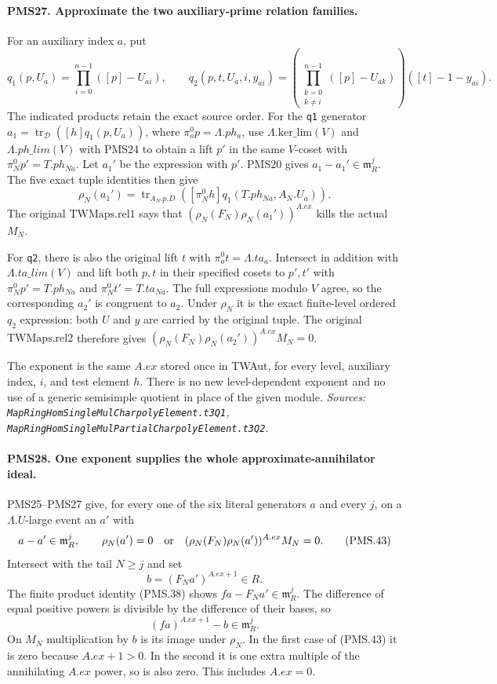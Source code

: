 \paragraph{PMS27. Approximate the two auxiliary-prime relation families.}
\label{claim:PMS27}
For an auxiliary index $a$, put
\[
 q_1(p,U_a)=\prod_{i=0}^{n-1}([p]-U_{ai}),\qquad
 q_2(p,t,U_a,i,y_{ai})
   =\left(\prod_{\substack{k=0\\k\ne i}}^{n-1}([p]-U_{ak})\right)
                         ([t]-1-y_{ai}).          \tag{PMS.42}
\]
The indicated products retain the exact source order.
For the \texttt{q1} generator
$a_1=\operatorname{tr}_{\mathcal D}([h]q_1(p,U_a))$,
where $\pi_o^0p=\Lambda.ph_a$, use
$\Lambda.\mathrm{ker\_lim}(V)$ and
$\Lambda.ph\_lim(V)$ with PMS24 to obtain a lift $p'$ in
the same $V$-coset with $\pi_N^0p'=T.ph_{Na}$.
Let $a_1'$ be the expression with $p'$.
PMS20 gives $a_1-a_1'\in\mathfrak m_R^j$.
The five exact tuple identities then give
\[
 \rho_N(a_1')
  =\operatorname{tr}_{A_N.p.D}
       ([\pi_N^0h]q_1(T.ph_{Na},A_N.U_a)).
\]
The original $\mathrm{TWMaps.rel1}$ says that
$(\rho_N(F_N)\rho_N(a_1'))^{A.ex}$ kills the actual $M_N$.

For \texttt{q2}, there is also the original lift $t$ with
$\pi_o^0t=\Lambda.ta_a$.
Intersect in addition with $\Lambda.ta\_lim(V)$ and lift both
$p,t$ in their specified cosets to $p',t'$ with
$\pi_N^0p'=T.ph_{Na}$ and $\pi_N^0t'=T.ta_{Na}$.
The full expressions modulo $V$ agree, so the corresponding
$a_2'$ is congruent to $a_2$.
Under $\rho_N$ it is the exact finite-level ordered $q_2$
expression: both $U$ and $y$ are carried by the original tuple.
The original $\mathrm{TWMaps.rel2}$ therefore gives
$(\rho_N(F_N)\rho_N(a_2'))^{A.ex}M_N=0$.

The exponent is the same $A.ex$ stored once in TWAut, for every
level, auxiliary index, $i$, and test element $h$.
There is no new level-dependent exponent and no use of a
generic semisimple quotient in place of the given module.
\hfill\textit{Sources: \texttt{MapRingHomSingleMulCharpolyElement.t3Q1},
\texttt{MapRingHomSingleMulPartialCharpolyElement.t3Q2}.}

\paragraph{PMS28. One exponent supplies the whole approximate-annihilator ideal.}
\label{claim:PMS28}
PMS25--PMS27 give, for every one of the six literal generators
$a$ and every $j$, on a $\Lambda.U$-large event an $a'$ with
\[
 a-a'\in\mathfrak m_R^j,\qquad
 \rho_N(a')=0
 \quad\hbox{or}\quad
 (\rho_N(F_N)\rho_N(a'))^{A.ex}M_N=0.             \tag{PMS.43}
\]
Intersect with the tail $N\geq j$ and set
\[
 b=(F_Na')^{A.ex+1}\in R.
\]
The finite product identity (PMS.38) shows
$fa-F_Na'\in\mathfrak m_R^j$.
The difference of equal positive powers is divisible by the
difference of their bases, so
\[
 (fa)^{A.ex+1}-b\in\mathfrak m_R^j.              \tag{PMS.44}
\]
On $M_N$ multiplication by $b$ is its image under $\rho_N$.
In the first case of (PMS.43) it is zero because $A.ex+1>0$.
In the second it is one extra multiple of the annihilating
$A.ex$ power, so is also zero.  This includes $A.ex=0$.

